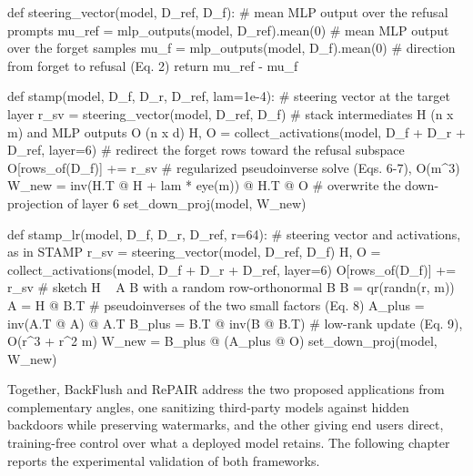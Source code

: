 \begin{codebox}
def steering_vector(model, D_ref, D_f):
    # mean MLP output over the refusal prompts
    mu_ref = mlp_outputs(model, D_ref).mean(0)
    # mean MLP output over the forget samples
    mu_f = mlp_outputs(model, D_f).mean(0)
    # direction from forget to refusal (Eq. 2)
    return mu_ref - mu_f


def stamp(model, D_f, D_r, D_ref, lam=1e-4):
    # steering vector at the target layer
    r_sv = steering_vector(model, D_ref, D_f)
    # stack intermediates H (n x m) and MLP outputs O (n x d)
    H, O = collect_activations(model, D_f + D_r + D_ref, layer=6)
    # redirect the forget rows toward the refusal subspace
    O[rows_of(D_f)] += r_sv
    # regularized pseudoinverse solve (Eqs. 6-7), O(m^3)
    W_new = inv(H.T @ H + lam * eye(m)) @ H.T @ O
    # overwrite the down-projection of layer 6
    set_down_proj(model, W_new)


def stamp_lr(model, D_f, D_r, D_ref, r=64):
    # steering vector and activations, as in STAMP
    r_sv = steering_vector(model, D_ref, D_f)
    H, O = collect_activations(model, D_f + D_r + D_ref, layer=6)
    O[rows_of(D_f)] += r_sv
    # sketch H ~ A B with a random row-orthonormal B
    B = qr(randn(r, m))
    A = H @ B.T
    # pseudoinverses of the two small factors (Eq. 8)
    A_plus = inv(A.T @ A) @ A.T
    B_plus = B.T @ inv(B @ B.T)
    # low-rank update (Eq. 9), O(r^3 + r^2 m)
    W_new = B_plus @ (A_plus @ O)
    set_down_proj(model, W_new)
\end{codebox}
\label{lst:stamp_code}

Together, BackFlush and RePAIR address the two proposed applications from complementary angles, one sanitizing third-party models against hidden backdoors while preserving watermarks, and the other giving end users direct, training-free control over what a deployed model retains. The following chapter reports the experimental validation of both frameworks.